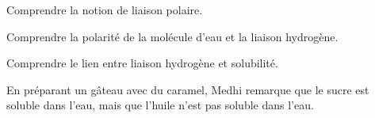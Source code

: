 \tetePremStssBiom

\vspace*{-30pt}


\begin{objectifs}
  \item Comprendre la notion de liaison polaire.
  \item Comprendre la polarité de la molécule d'eau et la liaison hydrogène.
  \item Comprendre le lien entre liaison hydrogène et solubilité.
\end{objectifs}

\begin{contexte}
  En préparant un gâteau avec du caramel, Medhi remarque que le sucre est soluble dans l'eau, mais que l'huile n'est pas soluble dans l'eau.
  
\end{contexte}


